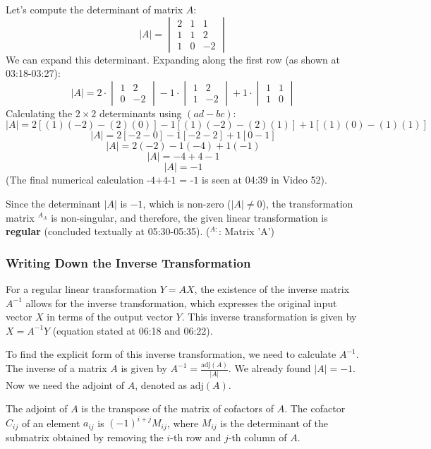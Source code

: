\documentclass{article}
\begin{document}
Let's compute the determinant of matrix $A$:
\[ |A| = \begin{vmatrix} 2 & 1 & 1 \\ 1 & 1 & 2 \\ 1 & 0 & -2 \end{vmatrix} \]
We can expand this determinant. Expanding along the first row (as shown at 03:18-03:27):
\[ |A| = 2 \cdot \begin{vmatrix} 1 & 2 \\ 0 & -2 \end{vmatrix} - 1 \cdot \begin{vmatrix} 1 & 2 \\ 1 & -2 \end{vmatrix} + 1 \cdot \begin{vmatrix} 1 & 1 \\ 1 & 0 \end{vmatrix} \]
Calculating the $2 \times 2$ determinants using $(ad - bc)$:
\[ |A| = 2[(1)(-2) - (2)(0)] - 1[(1)(-2) - (2)(1)] + 1[(1)(0) - (1)(1)] \]
\[ |A| = 2[-2 - 0] - 1[-2 - 2] + 1[0 - 1] \]
\[ |A| = 2(-2) - 1(-4) + 1(-1) \]
\[ |A| = -4 + 4 - 1 \]
\[ |A| = -1 \]
(The final numerical calculation $\text{-4+4-1 = -1}$ is seen at 04:39 in Video 52).

Since the determinant $|A|$ is $-1$, which is non-zero ($|A| \neq 0$), the transformation matrix ${}^{A_A}$ is non-singular, and therefore, the given linear transformation is \textbf{regular} (concluded textually at 05:30-05:35).
($^{A:}$: Matrix 'A')

\subsubsection*{Writing Down the Inverse Transformation}

For a regular linear transformation $Y = AX$, the existence of the inverse matrix $A^{-1}$ allows for the inverse transformation, which expresses the original input vector $X$ in terms of the output vector $Y$. This inverse transformation is given by $X = A^{-1}Y$ (equation stated at 06:18 and 06:22).

To find the explicit form of this inverse transformation, we need to calculate $A^{-1}$. The inverse of a matrix $A$ is given by $A^{-1} = \frac{\text{adj}(A)}{|A|}$. We already found $|A| = -1$. Now we need the adjoint of $A$, denoted as $\text{adj}(A)$.

The adjoint of $A$ is the transpose of the matrix of cofactors of $A$. The cofactor $C_{ij}$ of an element $a_{ij}$ is $(-1)^{i+j} M_{ij}$, where $M_{ij}$ is the determinant of the submatrix obtained by removing the $i$-th row and $j$-th column of $A$.
\end{document}
